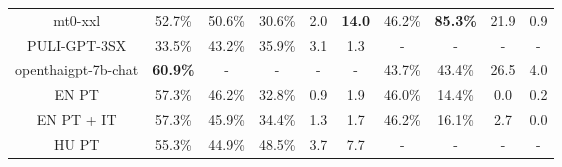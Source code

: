 {\begin{table}[]
\begin{adjustbox}{max width=\textwidth}
\begin{tabular}{ccccllllll}
mt0-xxl              &       52.7\%        &       50.6\%       &    30.6\%          & \multicolumn{1}{c}{2.0}                                   &\multicolumn{1}{c}{\textbf{14.0}}                                 & \multicolumn{1}{c}{46.2\%}                                  & \multicolumn{1}{c}{\textbf{85.3\%}}                                   & \multicolumn{1}{c}{21.9}                                   & \multicolumn{1}{c}{0.9}                                 \\
PULI-GPT-3SX              &     33.5\%          &        43.2\%      &       35.9\%       & \multicolumn{1}{c}{3.1}                                   &\multicolumn{1}{c}{1.3}                                 & \multicolumn{1}{c}{-}                                  & \multicolumn{1}{c}{-}                                   & \multicolumn{1}{c}{-}                                   & \multicolumn{1}{c}{-}                                 \\
openthaigpt-7b-chat              &     \textbf{60.9\%}          &        -      &       -       & \multicolumn{1}{c}{-}                                   &\multicolumn{1}{c}{-}                                 & \multicolumn{1}{c}{43.7\%}                                  & \multicolumn{1}{c}{43.4\%}                                   & \multicolumn{1}{c}{26.5}                                   & \multicolumn{1}{c}{4.0}                                 \\
\midrule
EN PT                & 57.3\%              & 46.2\%              & 32.8\%              & \multicolumn{1}{c}{0.9}                                   &\multicolumn{1}{c}{1.9}                                 & \multicolumn{1}{c}{46.0\%}                                  & \multicolumn{1}{c}{14.4\%}                                   & \multicolumn{1}{c}{0.0}                                   & \multicolumn{1}{c}{0.2}                                 \\
EN PT + IT          & 57.3\%              & 45.9\%              & 34.4\%              & \multicolumn{1}{c}{1.3}         & \multicolumn{1}{c}{1.7}       &  \multicolumn{1}{c}{46.2\%}                                  & \multicolumn{1}{c}{16.1\%}                                   & \multicolumn{1}{c}{2.7}                                   & \multicolumn{1}{c}{0.0}                                \\
HU PT                & 55.3\%              & 44.9\%              & 48.5\%              & \multicolumn{1}{c}{3.7}                                  &  \multicolumn{1}{c}{7.7}                              & \multicolumn{1}{c}{-}                                  & \multicolumn{1}{c}{-}                                   & \multicolumn{1}{c}{-}                                   & \multicolumn{1}{c}{-}                                 \\

\end{tabular}
\end{adjustbox}
\end{table}}
